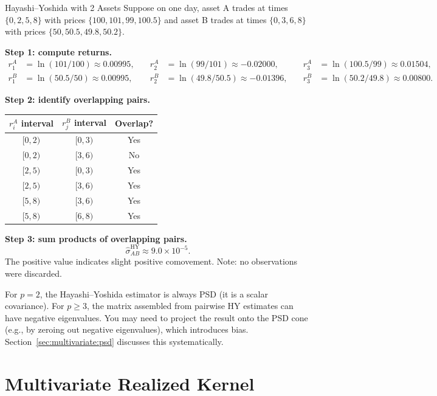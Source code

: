 \begin{workedexample}{Hayashi--Yoshida with 2 Assets}
Suppose on one day, asset A trades at times $\{0, 2, 5, 8\}$ with prices
$\{100, 101, 99, 100.5\}$ and asset B trades at times $\{0, 3, 6, 8\}$ with
prices $\{50, 50.5, 49.8, 50.2\}$.

\textbf{Step 1: compute returns.}
\begin{align*}
  r_1^A &= \ln(101/100) \approx 0.00995, &\quad
  r_2^A &= \ln(99/101) \approx -0.02000, &\quad
  r_3^A &= \ln(100.5/99) \approx 0.01504, \\
  r_1^B &= \ln(50.5/50) \approx 0.00995, &\quad
  r_2^B &= \ln(49.8/50.5) \approx -0.01396, &\quad
  r_3^B &= \ln(50.2/49.8) \approx 0.00800.
\end{align*}

\textbf{Step 2: identify overlapping pairs.}
\begin{center}
\begin{tabular}{ccc}
\toprule
$r_i^A$ interval & $r_j^B$ interval & Overlap? \\
\midrule
$[0,2)$ & $[0,3)$ & Yes \\
$[0,2)$ & $[3,6)$ & No  \\
$[2,5)$ & $[0,3)$ & Yes \\
$[2,5)$ & $[3,6)$ & Yes \\
$[5,8)$ & $[3,6)$ & Yes \\
$[5,8)$ & $[6,8)$ & Yes \\
\bottomrule
\end{tabular}
\end{center}

\textbf{Step 3: sum products of overlapping pairs.}
\[
  \widehat{\sigma}_{AB}^{\mathrm{HY}} \approx 9.0 \times 10^{-5}.
\]
The positive value indicates slight positive comovement. Note: no observations
were discarded.
\end{workedexample}

\begin{warning}
For $p = 2$, the Hayashi--Yoshida estimator is always PSD (it is a scalar
covariance). For $p \geq 3$, the matrix assembled from pairwise HY estimates
can have negative eigenvalues. You may need to project the result onto the
PSD cone (e.g., by zeroing out negative eigenvalues), which introduces bias.
Section~\ref{sec:multivariate:psd} discusses this systematically.
\end{warning}


\section{Multivariate Realized Kernel}\label{sec:multivariate:mrk}

